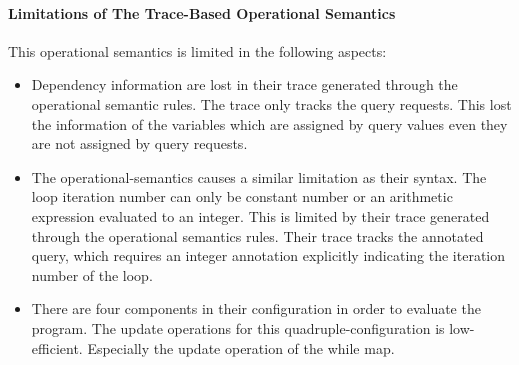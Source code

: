 \paragraph*{Limitations of The Trace-Based Operational Semantics}
This operational semantics is limited in the following aspects:
\begin{itemize}
    \item Dependency information are lost in their trace generated through the operational semantic rules.
    The trace only tracks the query requests. This lost the information of the variables
    which are assigned by query values even they are not assigned by query requests. 
    \item The operational-semantics causes a similar limitation as their syntax. The loop iteration number can only be constant number or an arithmetic expression evaluated to an integer. This is limited by their trace generated through the operational semantics rules.
    Their trace tracks the annotated query, which requires an integer annotation explicitly indicating the iteration number of the loop.
    \item There are four components in their configuration in order to evaluate the program. 
    The update operations for this quadruple-configuration is low-efficient. Especially the update operation of the while map.
\end{itemize}